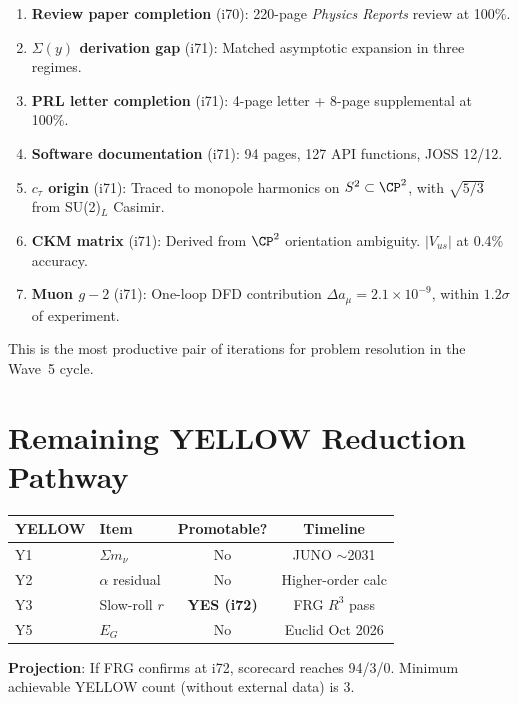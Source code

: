 \documentclass[11pt,a4paper]{article}
\begin{document}
\begin{enumerate}[nosep]
\item \textbf{Review paper completion} (i70): 220-page \textit{Physics Reports} review at 100\%.
\item \textbf{$\Sigma(y)$ derivation gap} (i71): Matched asymptotic expansion in three regimes.
\item \textbf{PRL letter completion} (i71): 4-page letter + 8-page supplemental at 100\%.
\item \textbf{Software documentation} (i71): 94 pages, 127 API functions, JOSS 12/12.
\item \textbf{$c_\tau$ origin} (i71): Traced to monopole harmonics on $S^2 \subset \CP^2$, with $\sqrt{5/3}$ from SU(2)$_L$ Casimir.
\item \textbf{CKM matrix} (i71): Derived from $\CP^2$ orientation ambiguity. $|V_{us}|$ at 0.4\% accuracy.
\item \textbf{Muon $g-2$} (i71): One-loop DFD contribution $\Delta a_\mu = 2.1 \times 10^{-9}$, within $1.2\sigma$ of experiment.
\end{enumerate}

This is the most productive pair of iterations for problem resolution in the Wave~5 cycle.


\section{Remaining YELLOW Reduction Pathway}

\begin{center}
\begin{tabular}{llcc}
\toprule
\textbf{YELLOW} & \textbf{Item} & \textbf{Promotable?} & \textbf{Timeline} \\
\midrule
Y1 & $\Sigma m_\nu$ & No & JUNO $\sim$2031 \\
Y2 & $\alpha$ residual & No & Higher-order calc \\
Y3 & Slow-roll $r$ & \textbf{YES (i72)} & FRG $R^3$ pass \\
Y5 & $E_G$ & No & Euclid Oct 2026 \\
\bottomrule
\end{tabular}
\end{center}

\textbf{Projection}: If FRG confirms at i72, scorecard reaches 94/3/0. Minimum achievable YELLOW count (without external data) is 3.
\end{document}
